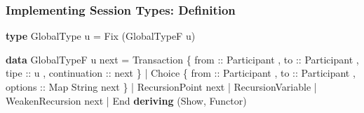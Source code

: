 \documentclass[12pt]{beamer}
\newenvironment{Shaded}{}{}
\newcommand{\KeywordTok}[1]{\textcolor[rgb]{0.00,0.44,0.13}{\textbf{#1}}}
\newcommand{\DataTypeTok}[1]{\textcolor[rgb]{0.56,0.13,0.00}{#1}}
\newcommand{\OtherTok}[1]{\textcolor[rgb]{0.00,0.44,0.13}{#1}}
\newcommand{\FunctionTok}[1]{\textcolor[rgb]{0.02,0.16,0.49}{#1}}
\newcommand{\NormalTok}[1]{#1}
\begin{document}
\begin{frame}[fragile]
\frametitle{Implementing Session Types: Definition}

\begin{Shaded}
\begin{Highlighting}[]
\KeywordTok{type} \DataTypeTok{GlobalType}\NormalTok{ u }\FunctionTok{=} \DataTypeTok{Fix}\NormalTok{ (}\DataTypeTok{GlobalTypeF}\NormalTok{ u)}

\KeywordTok{data} \DataTypeTok{GlobalTypeF}\NormalTok{ u next}
    \FunctionTok{=} \DataTypeTok{Transaction} 
\NormalTok{        \{}\OtherTok{ from ::} \DataTypeTok{Participant}
\NormalTok{        ,}\OtherTok{ to ::} \DataTypeTok{Participant}
\NormalTok{        ,}\OtherTok{ tipe ::}\NormalTok{ u}
\NormalTok{        ,}\OtherTok{ continuation ::}\NormalTok{  next }
\NormalTok{        \} }
    \FunctionTok{|} \DataTypeTok{Choice} 
\NormalTok{        \{}\OtherTok{ from ::} \DataTypeTok{Participant}
\NormalTok{        ,}\OtherTok{ to ::} \DataTypeTok{Participant}
\NormalTok{        ,}\OtherTok{ options ::} \DataTypeTok{Map} \DataTypeTok{String}\NormalTok{ next }
\NormalTok{        \}}
    \FunctionTok{|} \DataTypeTok{RecursionPoint}\NormalTok{ next}
    \FunctionTok{|} \DataTypeTok{RecursionVariable}
    \FunctionTok{|} \DataTypeTok{WeakenRecursion}\NormalTok{ next}
    \FunctionTok{|} \DataTypeTok{End}
    \KeywordTok{deriving}\NormalTok{ (}\DataTypeTok{Show}\NormalTok{, }\DataTypeTok{Functor}\NormalTok{)}
\end{Highlighting}
\end{Shaded}
\end{frame}
\end{document}

